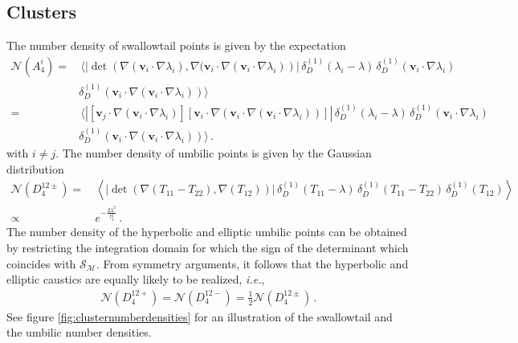 \documentclass[a4paper, 11pt]{article}
\begin{document}
\subsection{Clusters}\label{sec:clustersStats}
The number density of swallowtail points is given by the expectation 
\begin{align}
\mathcal{N}(A_4^{i}) 
=&\,\bigg \langle \left|\det\left(\nabla (\bm{v}_i \cdot \nabla \lambda_i), \nabla (\bm{v}_i \cdot \nabla(\bm{v}_i \cdot \nabla \lambda_i)\right)\right|\,
 \delta_D^{(1)}(\lambda_i - \lambda)\,
  \delta_D^{(1)}(\bm{v}_i \cdot \nabla \lambda_i) \nonumber\\
&\delta_D^{(1)}(\bm{v}_i \cdot \nabla(\bm{v}_i \cdot \nabla \lambda_i)) \bigg \rangle\\
=&\, \bigg \langle \left| \left[\bm{v}_j \cdot \nabla (\bm{v}_i \cdot \nabla \lambda_i)\right]\left[ \bm{v}_i \cdot \nabla (\bm{v}_i \cdot \nabla(\bm{v}_i \cdot \nabla \lambda_i))\right]\right|\,
 \delta_D^{(1)}(\lambda_i - \lambda)\,
  \delta_D^{(1)}(\bm{v}_i \cdot \nabla \lambda_i) \nonumber\\
&\delta_D^{(1)}(\bm{v}_i \cdot \nabla(\bm{v}_i \cdot \nabla \lambda_i)) \bigg \rangle\,.
\end{align}
with $i\neq j$. The number density of umbilic points is given by the Gaussian distribution
\begin{align}
\mathcal{N}(D_4^{12\pm}) 
=&\, \left \langle \left|\det\left(\nabla (T_{11}-T_{22}), \nabla (T_{12})\right)\right|\,
 \delta_D^{(1)}(T_{11} - \lambda)\,
  \delta_D^{(1)}(T_{11}-T_{22})\,
  \delta_D^{(1)}(T_{12}) \right \rangle\nonumber\\
\propto &\, e^{-\frac{2 \lambda^2}{\tau_2^2}} \,.
\end{align}
The number density of the hyperbolic and elliptic umbilic points can be obtained by restricting the integration domain for which the sign of the determinant which coincides with $\mathcal{S}_\mathcal{M}$. From symmetry arguments, it follows that the hyperbolic and elliptic caustics are equally likely to be realized, \textit{i.e.},
\begin{align}
\mathcal{N}(D_4^{12+}) = \mathcal{N}(D_4^{12-}) =\frac{1}{2}\mathcal{N}(D_4^{12\pm})\,.
\end{align}
See figure \ref{fig:clusternumberdensities} for an illustration of the swallowtail and the umbilic number densities.
\end{document}
